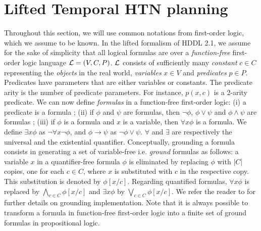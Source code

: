 \documentclass[letterpaper]{article} %
\begin{document}
\section{Lifted Temporal HTN planning}


Throughout this section, we will use common notations from first-order logic, which we assume to be known. In the lifted formalism of HDDL 2.1, we assume for the sake of simplicity that all logical formulas are over a {\it function-free} first-order logic language ${\cal{L}} = (V, C, P)$. ${\cal{L}}$ consists of sufficiently many {\it constant} $c \in C$ representing the {\it objects} in the real world, {\it variables} $x \in V$ and {\it predicates} $p \in P$. Predicates have parameters that are either variables or constants. The predicate arity is the number of predicate parameters. For instance, $p(x, c)$ is a 2-arity predicate. We can now define {\it formulas} in a function-free first-order logic: (i) a predicate is a formula ; (ii) if ${\phi}$ and ${\psi}$ are formulas, then $\neg \phi$, $\phi \vee \psi$ and $\phi \wedge \psi$ are formulas ; (iii) if $\phi$ is a formula and $x$ is a variable, then $\forall x \phi$ is a formula. We define $\exists x \phi$ as $\neg \forall x \neg \phi$, and $\phi \rightarrow \psi$ as $\neg \phi \vee \psi$. $\forall$ and $\exists$ are respectively the universal and the existential quantifier. Conceptually, grounding a formula consists in generating a set of variable-free i.e. {\it ground} formulas \cite{helmert} as follows: a variable $x$ in a quantifier-free formula $\phi$ is eliminated by replacing $\phi$ with $|C|$ copies, one for each $c \in C$, where $x$ is substituted with $c$ in the respective copy. This substitution is denoted by $\phi[x/c]$. Regarding quantified formulas, $\forall x \phi$ is replaced by $\bigwedge_{c \in C} \phi[x/c]$ and $\exists x \phi$ by $\bigvee_{c \in C} \phi[x/c]$. We refer the reader to \cite{behnke20,ramoul17} for further details on grounding implementation. Note that it is always possible to transform a formula in function-free first-order logic into a finite set of ground formulas in propositional logic.
\end{document}
